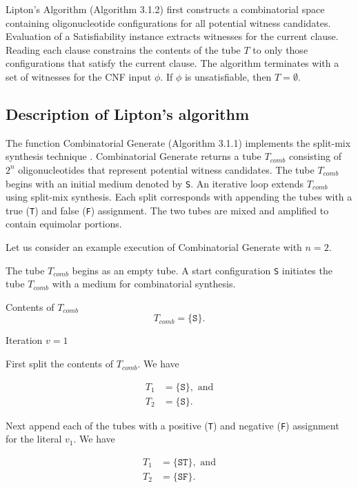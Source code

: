 {\sc Lipton's Algorithm} (Algorithm 3.1.2) first constructs a combinatorial space containing oligonucleotide configurations for all potential witness candidates.  Evaluation of a {\sc Satisfiability} instance extracts witnesses for the current clause.  Reading each clause constrains the contents of the tube $T$ to only those configurations that satisfy the current clause.  The algorithm terminates with a set of witnesses for the CNF input $\phi$.  If $\phi$ is unsatisfiable, then $T = \emptyset$.  

	\subsection{Description of Lipton's algorithm}
		
The function {\sc Combinatorial Generate} (Algorithm 3.1.1) implements the split-mix synthesis technique \cite{furka1982, furkaBook}.  {\sc Combinatorial Generate} returns a tube $T_{comb}$ consisting of $2^n$ oligonucleotides that represent potential witness candidates.  The tube $T_{comb}$ begins with an initial medium denoted by \texttt{S}.  An iterative loop extends $T_{comb}$ using split-mix synthesis.  Each split corresponds with appending the tubes with a true (\texttt{T}) and false (\texttt{F}) assignment.  The two tubes are mixed and amplified to contain equimolar portions.  

	
\FloatBarrier

Let us consider an example execution of {\sc Combinatorial Generate} with $n = 2$.

\noindent The tube $T_{comb}$ begins as an empty tube.  A start configuration \texttt{S} initiates the tube $T_{comb}$ with a medium for combinatorial synthesis.

\noindent Contents of $T_{comb}$
\[
T_{comb} = \{ \texttt{S} \}.
\]

\noindent Iteration $v = 1$

First split the contents of $T_{comb}$.  We have

\begin{align*}
 T_1 &= \{ \texttt{S} \}, \text{ and} \\
 T_2 &= \{ \texttt{S} \}.
\end{align*}

Next append each of the tubes with a positive (\texttt{T}) and negative (\texttt{F}) assignment for the literal $v_1$.  We have

\begin{align*}
 T_1 &= \{ \texttt{ST} \}, \text{ and} \\
 T_2 &= \{ \texttt{SF} \}.
\end{align*}


